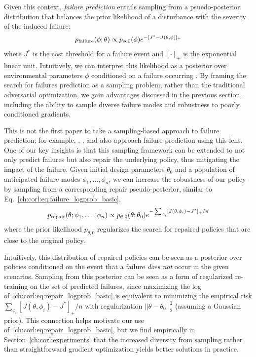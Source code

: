 {Given this context, \textit{failure prediction} entails sampling from a psuedo-posterior distribution that balances the prior likelihood of a disturbance with the severity of the induced failure:
%
\begin{equation}
    p_{\rm{failure}}(\phi; \theta) \propto p_{\phi, 0}(\phi)e^{-[J^* - J(\theta, \phi)]_+} \label{ch:corl:eq:failure_logprob_basic}
\end{equation}
%
where $J^*$ is the cost threshold for a failure event and $[\cdot]_+$ is the exponential linear unit. Intuitively, we can interpret this likelihood as a posterior over environmental parameters $\phi$ conditioned on a failure occurring \cite{sinhaNeuralBridgeSampling2020,zhouRoCUSRobotController2021,maSamplingCanBe2019,dawsonBayesianApproachBreaking2023}. By framing the search for failures prediction as a sampling problem, rather than the traditional adversarial optimization, we gain advantages discussed in the previous section, including the ability to sample diverse failure modes and robustness to poorly conditioned gradients.

This is not the first paper to take a sampling-based approach to failure prediction; for example, \cite{okellyScalableEndtoEndAutonomous2018}, \cite{sinhaNeuralBridgeSampling2020}, and \cite{zhouRoCUSRobotController2021} also approach failure prediction using this lens. One of our key insights is that this sampling framework can be extended to not only predict failures but also repair the underlying policy, thus mitigating the impact of the failure.
%
Given initial design parameters $\theta_0$ and a population of anticipated failure modes $\phi_1, \ldots, \phi_n$, we can increase the robustness of our policy by sampling from a corresponding repair pseudo-posterior, similar to Eq.~\eqref{ch:corl:eq:failure_logprob_basic},
%
\begin{equation}
    p_{\rm{repair}}(\theta; \phi_1, \ldots, \phi_n) \propto p_{\theta, 0}(\theta; \theta_0)e^{-\sum_{\phi_i}[J(\theta, \phi_i) - J^*]_+ / n} \label{ch:corl:eq:repair_logprob_basic}
\end{equation}
%
where the prior likelihood $p_{\theta, 0}$ regularizes the search for repaired policies that are close to the original policy.

Intuitively, this distribution of repaired policies can be seen as a posterior over policies conditioned on the event that a failure \textit{does not} occur in the given scenarios. Sampling from this posterior can be seen as a form of regularized re-training on the set of predicted failures, since maximizing the log of~\eqref{ch:corl:eq:repair_logprob_basic} is equivalent to minimizing the empirical risk $\sum_{\phi_i}[J(\theta, \phi_i) - J^*]_+ / n$ with regularization $||\theta-\theta_0||_2^2$ (assuming a Gaussian prior). This connection helps motivate our use of~\eqref{ch:corl:eq:repair_logprob_basic}, but we find empirically in Section~\ref{ch:corl:experiments} that the increased diversity from sampling rather than straightforward gradient optimization yields better solutions in practice.

}
